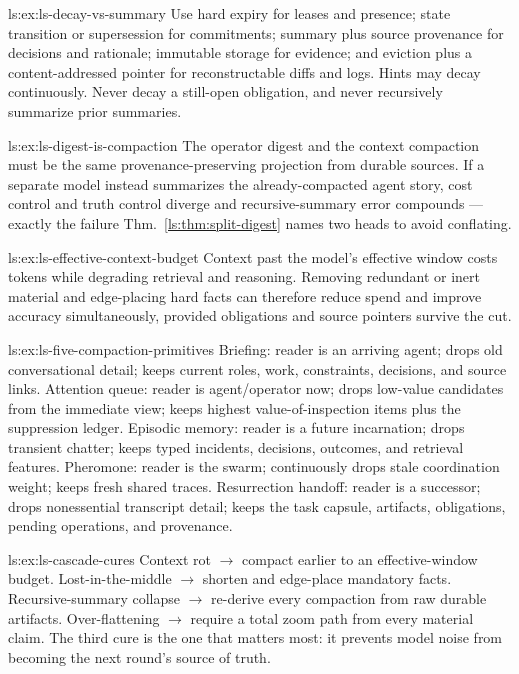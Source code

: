 \begin{pdSolution}{ls:ex:ls-decay-vs-summary}
Use hard expiry for leases and presence; state transition or supersession for commitments; summary plus source provenance for decisions and rationale; immutable storage for evidence; and eviction plus a content-addressed pointer for reconstructable diffs and logs. Hints may decay continuously. Never decay a still-open obligation, and never recursively summarize prior summaries.
\end{pdSolution}
\begin{pdSolution}{ls:ex:ls-digest-is-compaction}
The operator digest and the context compaction must be the same provenance-preserving projection from durable sources. If a separate model instead summarizes the already-compacted agent story, cost control and truth control diverge and recursive-summary error compounds --- exactly the failure Thm.~\ref{ls:thm:split-digest} names two heads to avoid conflating.
\end{pdSolution}
\begin{pdSolution}{ls:ex:ls-effective-context-budget}
Context past the model's effective window costs tokens while degrading retrieval and reasoning. Removing redundant or inert material and edge-placing hard facts can therefore reduce spend and improve accuracy simultaneously, provided obligations and source pointers survive the cut.
\end{pdSolution}
\begin{pdSolution}{ls:ex:ls-five-compaction-primitives}
Briefing: reader is an arriving agent; drops old conversational detail; keeps current roles, work, constraints, decisions, and source links. Attention queue: reader is agent/operator now; drops low-value candidates from the immediate view; keeps highest value-of-inspection items plus the suppression ledger. Episodic memory: reader is a future incarnation; drops transient chatter; keeps typed incidents, decisions, outcomes, and retrieval features. Pheromone: reader is the swarm; continuously drops stale coordination weight; keeps fresh shared traces. Resurrection handoff: reader is a successor; drops nonessential transcript detail; keeps the task capsule, artifacts, obligations, pending operations, and provenance.
\end{pdSolution}
\begin{pdSolution}{ls:ex:ls-cascade-cures}
Context rot $\to$ compact earlier to an effective-window budget. Lost-in-the-middle $\to$ shorten and edge-place mandatory facts. Recursive-summary collapse $\to$ re-derive every compaction from raw durable artifacts. Over-flattening $\to$ require a total zoom path from every material claim. The third cure is the one that matters most: it prevents model noise from becoming the next round's source of truth.
\end{pdSolution}
